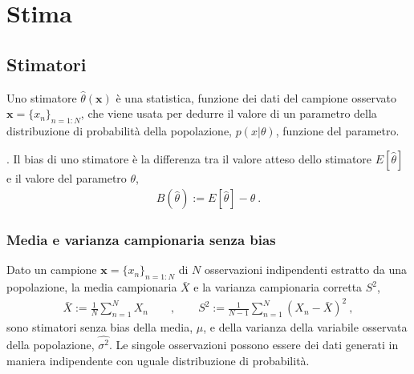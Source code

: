 \documentclass[letterpaper,10pt,italian]{jupyterBook}
\begin{document}
\sphinxstepscope


\section{Stima}
\label{\detokenize{ch/statistics/estimate:stima}}\label{\detokenize{ch/statistics/estimate:statistics-hs-inference-estimate}}\label{\detokenize{ch/statistics/estimate::doc}}

\subsection{Stimatori}
\label{\detokenize{ch/statistics/estimate:stimatori}}
\sphinxAtStartPar
Uno stimatore \(\hat{\theta}(\mathbf{x})\) è una statistica, funzione dei dati del campione osservato \(\mathbf{x} = \{ x_n \}_{n=1:N}\), che viene usata per dedurre il valore di un parametro della distribuzione di probabilità della popolazione, \(p(x|\theta)\), funzione del parametro.

\sphinxAtStartPar
{}. Il bias di uno stimatore è la differenza tra il valore atteso dello stimatore \(E[ \hat{\theta} ]\) e il valore del parametro \(\theta\),
\begin{equation*}
\begin{split}B(\hat{\theta}) := E[ \hat{\theta} ] - \theta \ .\end{split}
\end{equation*}

\subsubsection{Media e varianza campionaria senza bias}
\label{\detokenize{ch/statistics/estimate:media-e-varianza-campionaria-senza-bias}}
\sphinxAtStartPar
Dato un campione \(\mathbf{x} = \{ x_n \}_{n=1:N}\) di \(N\) osservazioni indipendenti estratto da una popolazione, la media campionaria \(\bar{X}\) e la varianza campionaria corretta \(S^2\),
\begin{equation*}
\begin{split}\bar{X} := \frac{1}{N} \sum_{n = 1}^{N} X_n \qquad , \qquad S^2 := \frac{1}{N-1} \sum_{n=1}^N (X_n - \bar{X})^2 \ ,\end{split}
\end{equation*}
\sphinxAtStartPar
sono stimatori senza bias della media, \(\hat{\mu}\), e della varianza della variabile osservata della popolazione, \(\hat{\sigma^2}\). Le singole osservazioni possono essere dei dati generati in maniera indipendente con uguale distribuzione di probabilità.
\end{document}
